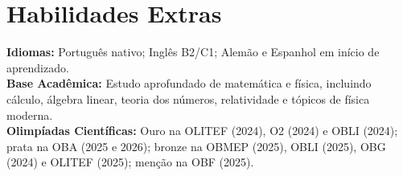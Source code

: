 \documentclass[letterpaper,11pt]{article}
\begin{document}
\section{Habilidades Extras}
\begin{itemize}[leftmargin=0.15in, label={}]
\small{\item{
 \textbf{Idiomas:} Português nativo; Inglês B2/C1; Alemão e Espanhol em início de aprendizado. \\

 \textbf{Base Acadêmica:} Estudo aprofundado de matemática e física, incluindo cálculo, álgebra linear, teoria dos números, relatividade e tópicos de física moderna. \\

 \textbf{Olimpíadas Científicas:} Ouro na OLITEF (2024), O2 (2024) e OBLI (2024); prata na OBA (2025 e 2026); bronze na OBMEP (2025), OBLI (2025), OBG (2024) e OLITEF (2025); menção na OBF (2025). \\
}}
\end{itemize}
\end{document}
